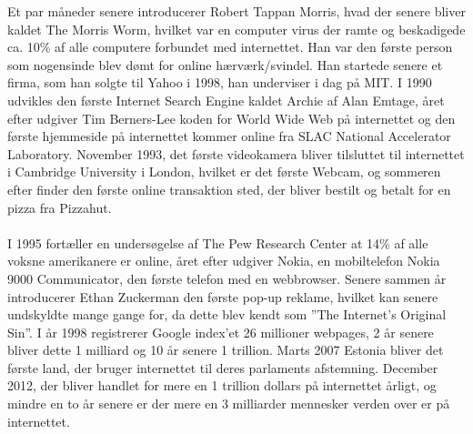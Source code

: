         Et par måneder senere introducerer Robert Tappan Morris, hvad der senere bliver kaldet The Morris Worm, hvilket var en computer virus der ramte og beskadigede ca. 10\% af alle computere forbundet med internettet. Han var den første person som nogensinde blev dømt for online hærværk/svindel. Han startede senere et firma, som han solgte til Yahoo i 1998, han underviser i dag på MIT. I 1990 udvikles den første Internet Search Engine kaldet Archie af Alan Emtage, året efter udgiver Tim Berners-Lee koden for World Wide Web på internettet og den første hjemmeside på internettet kommer online fra SLAC National Accelerator Laboratory. November 1993, det første videokamera bliver tilsluttet til internettet i Cambridge University i London, hvilket er det første Webcam, og sommeren efter finder den første online transaktion sted, der bliver bestilt og betalt for en pizza fra Pizzahut.\\\\
        I 1995 fortæller en undersøgelse af The Pew Research Center at 14\% af alle voksne amerikanere er online, året efter udgiver Nokia, en mobiltelefon Nokia 9000 Communicator, den første telefon med en webbrowser. Senere sammen år introducerer Ethan Zuckerman den første pop-up reklame, hvilket kan senere undskyldte mange gange for, da dette blev kendt som ”The Internet’s Original Sin”. I år 1998 registrerer Google index’et 26 millioner webpages, 2 år senere bliver dette 1 milliard og 10 år senere 1 trillion. Marts 2007 Estonia bliver det første land, der bruger internettet til deres parlaments afstemning. December 2012, der bliver handlet for mere en 1 trillion dollars på internettet årligt, og mindre en to år senere er der mere en 3 milliarder mennesker verden over er på internettet.\autocite{gilpress2015}\\

    
    

